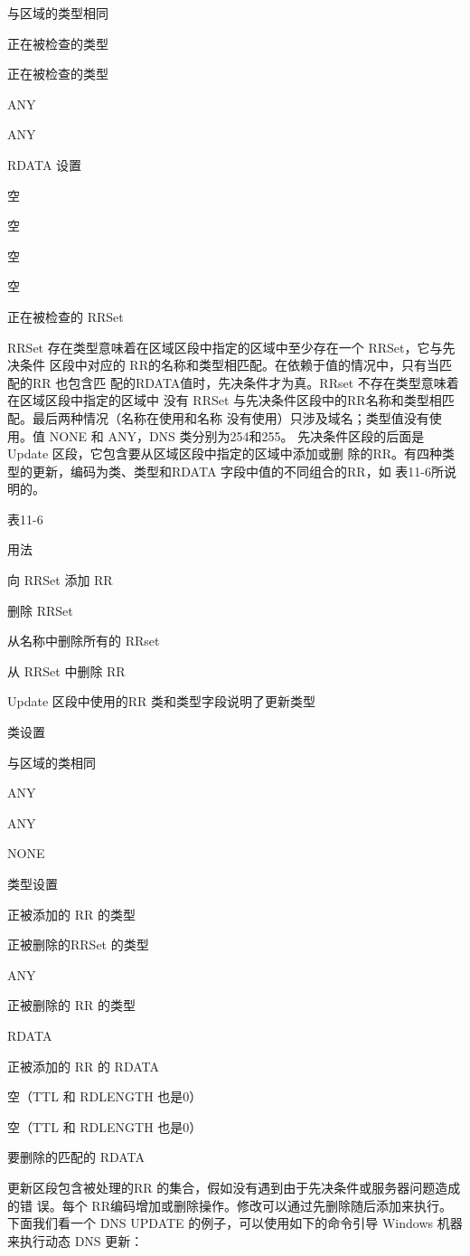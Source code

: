 与区域的类型相同

正在被检查的类型

正在被检查的类型

ANY

ANY

RDATA 设置

空

空

空

空

正在被检查的 RRSet

RRSet 存在类型意味着在区域区段中指定的区域中至少存在一个 RRSet，它与先决条件
区段中对应的 RR的名称和类型相匹配。在依赖于值的情况中，只有当匹配的RR 也包含匹
配的RDATA值时，先决条件才为真。RRset 不存在类型意味着在区域区段中指定的区域中
没有 RRSet 与先决条件区段中的RR名称和类型相匹配。最后两种情况（名称在使用和名称
没有使用）只涉及域名；类型值没有使用。值 NONE 和 ANY，DNS 类分别为254和255。
先决条件区段的后面是Update 区段，它包含要从区域区段中指定的区域中添加或删
除的RR。有四种类型的更新，编码为类、类型和RDATA 字段中值的不同组合的RR，如
表11-6所说明的。

表11-6

用法

向 RRSet 添加 RR

删除 RRSet

从名称中删除所有的 RRset

从 RRSet 中删除 RR

Update 区段中使用的RR 类和类型字段说明了更新类型

类设置

与区域的类相同

ANY

ANY

NONE

类型设置

正被添加的 RR 的类型

正被删除的RRSet 的类型

ANY

正被删除的 RR 的类型

RDATA

正被添加的 RR 的 RDATA

空（TTL 和 RDLENGTH 也是0）

空（TTL 和 RDLENGTH 也是0）

要删除的匹配的 RDATA

更新区段包含被处理的RR 的集合，假如没有遇到由于先决条件或服务器问题造成的错
误。每个 RR编码增加或删除操作。修改可以通过先删除随后添加来执行。下面我们看一个
DNS UPDATE 的例子，可以使用如下的命令引导 Windows 机器来执行动态 DNS 更新：

